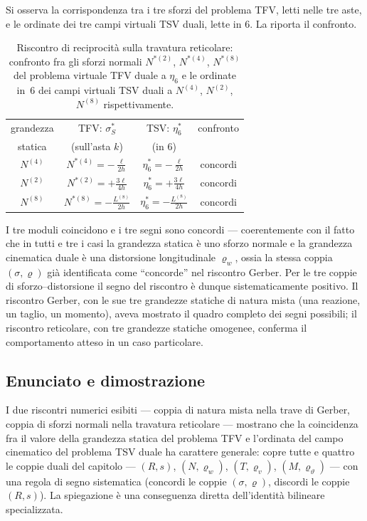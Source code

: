 Si osserva la corrispondenza tra i tre sforzi del problema TFV, 
letti nelle tre aste, e le ordinate dei tre campi virtuali TSV 
duali, lette in $6$. La  
riporta il confronto.

\begin{table}[ht]
	\centering
	\renewcommand{\arraystretch}{1.4}
	\begin{tabular}{c|c|c|c}
		\hline
		grandezza & TFV: $\sigma^{*}_S$ & TSV: $\eta^{*}_6$ & 
		confronto \\
		statica & (sull'asta $k$) & (in $6$) & \\
		\hline
		$N^{(4)}$ & $N^{*(4)}=-\tfrac{\ell}{2h}$ & 
		$\eta^{*}_6=-\tfrac{\ell}{2h}$ & concordi \\
		$N^{(2)}$ & $N^{*(2)}=+\tfrac{3\ell}{4h}$ & 
		$\eta^{*}_6=+\tfrac{3\ell}{4h}$ & concordi \\
		$N^{(8)}$ & $N^{*(8)}=-\tfrac{L^{(8)}}{2h}$ & 
		$\eta^{*}_6=-\tfrac{L^{(8)}}{2h}$ & concordi \\
		\hline
	\end{tabular}
	\caption{Riscontro di reciprocità sulla travatura reticolare: 
		confronto fra gli sforzi normali $N^{*(2)}$, $N^{*(4)}$, 
		$N^{*(8)}$ del problema virtuale TFV duale a $\eta_6$ e le 
		ordinate in~$6$ dei campi virtuali TSV duali a $N^{(4)}$, 
		$N^{(2)}$, $N^{(8)}$ rispettivamente.}
	\label{tab:reciprocita_reticolare}
\end{table}

I tre moduli coincidono e i tre segni sono concordi --- 
coerentemente con il fatto che in tutti e tre i casi la grandezza 
statica è uno sforzo normale e la grandezza cinematica duale è una 
distorsione longitudinale $\varrho_w$, ossia la stessa coppia 
$(\sigma, \varrho)$ già identificata come ``concorde'' nel riscontro 
Gerber. Per le tre coppie di sforzo--distorsione il segno del 
riscontro è dunque sistematicamente positivo. Il riscontro Gerber, 
con le sue tre grandezze statiche di natura mista (una reazione, un 
taglio, un momento), aveva mostrato il quadro completo dei segni 
possibili; il riscontro reticolare, con tre grandezze statiche 
omogenee, conferma il comportamento atteso in un caso particolare.


\subsection*{Enunciato e dimostrazione}

I due riscontri numerici esibiti --- coppia di natura mista nella 
trave di Gerber, coppia di sforzi normali nella travatura 
reticolare --- mostrano che la coincidenza fra il valore della 
grandezza statica del problema TFV e l'ordinata del campo 
cinematico del problema TSV duale ha carattere generale: copre 
tutte e quattro le coppie duali del capitolo --- $(R, s)$, $(N, 
\varrho_w)$, $(T, \varrho_v)$, $(M, \varrho_\vartheta)$ --- con 
una regola di segno sistematica (concordi le coppie 
$(\sigma, \varrho)$, discordi le coppie $(R, s)$). La spiegazione 
è una conseguenza diretta dell'identità bilineare specializzata.

